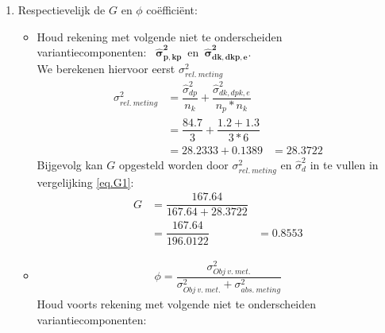 {\begin{enumerate}
\begin{itemize}
	\begin{tabular}{|c|c|c|c|c|c|c|c|} \hline
	 & $ \hat{\sigma}^2_{d} $ & $ \hat{\sigma}^2_{k} $& $ \hat{\sigma}^2_{p, dp} $ & $ \hat{\sigma}^2_{dk} $ & $ \hat{\sigma}^2_{dp} $ & $ \hat{\sigma}^2_{kp} $ &
	 $\sigma^2_{kp, dpk, e}$ \\ \hline
	$\sigma^2$  			& $167.64$ 			    & $ 3.211 $  	& $615.8+84.7$   & $1.3$ & $ . $	& $ . $& $ 1.2 + 1.3$ \\
	$n_.$ 				& . 					& $3$			& 2	  & $ 3$		  	 & $ . $ 	& $ . $&  $2 *3$ \\ \hline
	$\sigma^2 / n_.$      & .						& $1.0703 $		& $350.25$   & $0.4333$		 & $.$		& $ . $&  $0.4167$ \\ \hline
	\end{tabular} \\
	De grafische weergave van dit opzet is het volgende:\\

	
\end{itemize}

\item Respectievelijk de $G$ en $\phi$ co\"effici\"ent:
\begin{itemize}
	\item	Houd rekening met volgende niet te onderscheiden variantiecomponenten:~ 
	$ \bm{\hat{\sigma}^2_{p,kp}} $~en~$\bm{\hat{\sigma}^2_{dk, dkp, e} }$.\\
	We berekenen hiervoor eerst $\sigma^2_{rel.~meting}$
	\begin{align*}
		\sigma^2_{rel.~meting} 	&=  \dfrac{\hat{\sigma}^2_{dp}}{n_k} + \dfrac{\hat{\sigma}^2_{dk,dpk,e}}{n_p*n_k} \\
								&=  \dfrac{{84.7}}{3} + \dfrac{{1.2 + 1.3}}{3*6}\\
								&= 28.2333 + 0.1389 &= 28.3722
	\end{align*}
	Bijgevolg kan $G$ opgesteld worden door $\sigma^2_{rel.~meting}$ en $\hat{\sigma}^2_{d}$ in te vullen in vergelijking \ref{eq.G1}:
	\begin{align*}
		G 	&=\dfrac{167.64}{167.64+  28.3722}\\
			&=\dfrac{167.64}{ 196.0122}&=0.8553
	\end{align*}

	\item
	\begin{align}
		\phi =\dfrac{\sigma^2_{Obj~v.~met.}}{\sigma^2_{Obj~v.~met.}+ \sigma^2_{abs.~meting}} \label{eq.phi}
	\end{align}
	Houd voorts rekening met volgende niet te onderscheiden variantiecomponenten:~ \\


\end{itemize}
\end{enumerate}}
